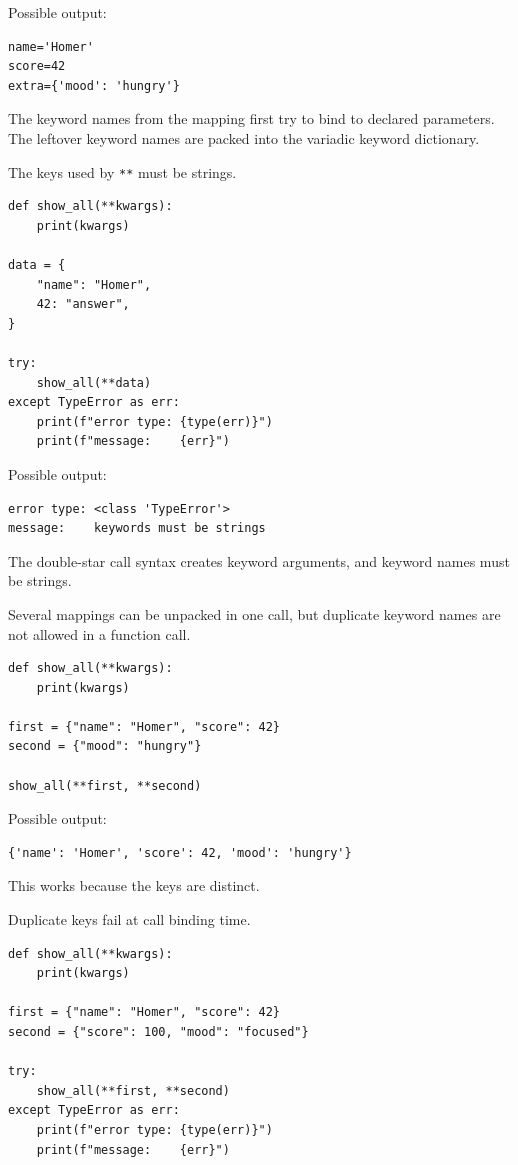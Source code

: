 Possible output:

\begin{verbatim}
name='Homer'
score=42
extra={'mood': 'hungry'}
\end{verbatim}

The keyword names from the mapping first try to bind to declared parameters. The leftover keyword names are packed into the variadic keyword dictionary.

The keys used by \texttt{**} must be strings.

\begin{verbatim}
def show_all(**kwargs):
    print(kwargs)

data = {
    "name": "Homer",
    42: "answer",
}

try:
    show_all(**data)
except TypeError as err:
    print(f"error type: {type(err)}")
    print(f"message:    {err}")
\end{verbatim}

Possible output:

\begin{verbatim}
error type: <class 'TypeError'>
message:    keywords must be strings
\end{verbatim}

The double-star call syntax creates keyword arguments, and keyword names must be strings.

Several mappings can be unpacked in one call, but duplicate keyword names are not allowed in a function call.

\begin{verbatim}
def show_all(**kwargs):
    print(kwargs)

first = {"name": "Homer", "score": 42}
second = {"mood": "hungry"}

show_all(**first, **second)
\end{verbatim}

Possible output:

\begin{verbatim}
{'name': 'Homer', 'score': 42, 'mood': 'hungry'}
\end{verbatim}

This works because the keys are distinct.

Duplicate keys fail at call binding time.

\begin{verbatim}
def show_all(**kwargs):
    print(kwargs)

first = {"name": "Homer", "score": 42}
second = {"score": 100, "mood": "focused"}

try:
    show_all(**first, **second)
except TypeError as err:
    print(f"error type: {type(err)}")
    print(f"message:    {err}")
\end{verbatim}

